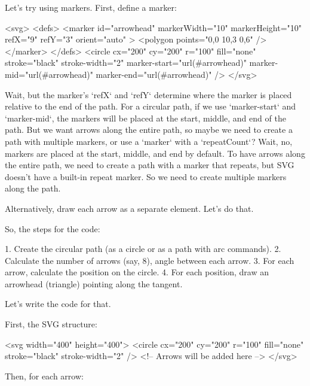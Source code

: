 Let's try using markers. First, define a marker:

<svg>
  <defs>
    <marker id="arrowhead" markerWidth="10" markerHeight="10" refX="9" refY="3" orient="auto" >
      <polygon points="0,0 10,3 0,6" />
    </marker>
  </defs>
  <circle cx="200" cy="200" r="100" fill="none" stroke="black" stroke-width="2" marker-start="url(#arrowhead)" marker-mid="url(#arrowhead)" marker-end="url(#arrowhead)" />
</svg>

Wait, but the marker's `refX` and `refY` determine where the marker is placed relative to the end of the path. For a circular path, if we use `marker-start` and `marker-mid`, the markers will be placed at the start, middle, and end of the path. But we want arrows along the entire path, so maybe we need to create a path with multiple markers, or use a `marker` with a `repeatCount`? Wait, no, markers are placed at the start, middle, and end by default. To have arrows along the entire path, we need to create a path with a marker that repeats, but SVG doesn't have a built-in repeat marker. So we need to create multiple markers along the path.

Alternatively, draw each arrow as a separate element. Let's do that.

So, the steps for the code:

1. Create the circular path (as a circle or as a path with arc commands).
2. Calculate the number of arrows (say, 8), angle between each arrow.
3. For each arrow, calculate the position on the circle.
4. For each position, draw an arrowhead (triangle) pointing along the tangent.

Let's write the code for that.

First, the SVG structure:

<svg width="400" height="400">
  <circle cx="200" cy="200" r="100" fill="none" stroke="black" stroke-width="2" />
  <!-- Arrows will be added here -->
</svg>

Then, for each arrow:

